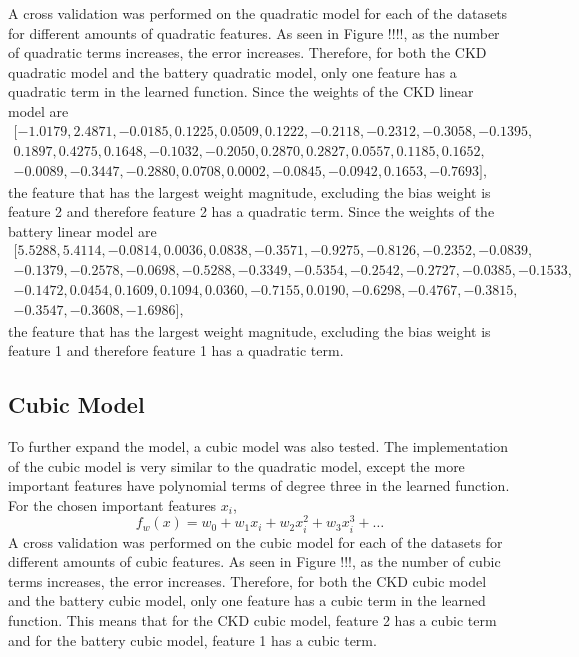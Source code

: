 \documentclass{article}
\begin{document}
A cross validation was performed on the quadratic model for each of the datasets for different amounts of quadratic features.  As seen in Figure !!!!, 
as the number of quadratic terms increases, the error increases.  Therefore, for both the CKD quadratic model and the battery quadratic model, only one feature has a quadratic term in the learned function.   
Since the weights of the CKD linear model are 
\begin{equation*}
  \begin{aligned}
    [-1.0179,  2.4871, -0.0185,  0.1225, 0.0509,  0.1222, -0.2118, -0.2312, -0.3058, -0.1395, \\
    0.1897,  0.4275,  0.1648, -0.1032, -0.2050,  0.2870,  0.2827,  0.0557, 0.1185,  0.1652, \\
    -0.0089, -0.3447, -0.2880,  0.0708, 0.0002, -0.0845, -0.0942,  0.1653, -0.7693],
  \end{aligned}
\end{equation*}
the feature that has the largest weight magnitude, excluding  the bias weight is feature 2 and therefore feature 2 has a quadratic term.   
Since the weights of the battery linear model are 
\begin{equation*}
  \begin{aligned}
    [5.5288, 5.4114, -0.0814, 0.0036, 0.0838, -0.3571, -0.9275, -0.8126, -0.2352, -0.0839, \\
    -0.1379, -0.2578, -0.0698, -0.5288, -0.3349, -0.5354, -0.2542, -0.2727, -0.0385, -0.1533, \\
    -0.1472, 0.0454, 0.1609, 0.1094, 0.0360, -0.7155, 0.0190, -0.6298, -0.4767, -0.3815, \\
    -0.3547, -0.3608, -1.6986],
  \end{aligned}
  \end{equation*}
the feature that has the largest weight magnitude, excluding the bias weight is feature 1 and therefore feature 1 has a quadratic term. 

\subsection{Cubic Model}

To further expand the model, a cubic model was also tested.   The implementation of the cubic model is very similar to the quadratic model, except the more important features have polynomial terms of degree three in the learned function.  For the chosen important features $x_i$,
\begin{equation}
  f_w (x) = w_0 + w_1 x_i + w_2 x^2_i + w_3 x^3_i + \dots
\end{equation}
A cross validation was performed on the cubic model for each of the datasets for different amounts of cubic features.  
As seen in Figure !!!, as the number of cubic terms increases, the error increases.  Therefore, for both the CKD cubic model and the battery cubic model, only one feature has a cubic term in the learned function.  
This means that for the CKD cubic model, feature 2 has a cubic term and for the battery cubic model, feature 1 has a cubic term. 
\end{document}
